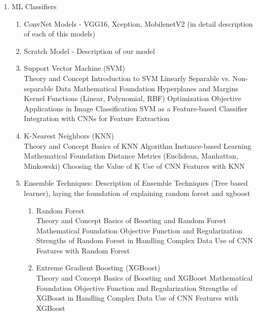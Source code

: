 \begin{enumerate}
\begin{enumerate}
           \item ML Classifiers
                \begin{enumerate}
                    \item ConvNet Models - VGG16, Xception, MobilenetV2 (in detail description of each of this models)
                    \item Scratch Model - Description of our model
                    \item Support Vector Machine (SVM)\\
                        Theory and Concept
                        Introduction to SVM
                        Linearly Separable vs. Non-separable Data
                        Mathematical Foundation
                        Hyperplanes and Margins
                        Kernel Functions (Linear, Polynomial, RBF)
                        Optimization Objective
                        Applications in Image Classification
                        SVM as a Feature-based Classifier
                        Integration with CNNs for Feature Extraction
                        
                    \item K-Nearest Neighbors (KNN)\\
                        Theory and Concept
                        Basics of KNN Algorithm
                        Instance-based Learning
                        Mathematical Foundation
                        Distance Metrics (Euclidean, Manhattan, Minkowski)
                        Choosing the Value of K
                        Use of CNN Features with KNN\\
                    \item Ensemble Techniques: Description of Ensemble Techniques (Tree based learner), laying the foundation of explaining random forest and xgboost
                    \begin{enumerate}
                        \item Random Forest\\                
                        Theory and Concept
                        Basics of Boosting and Random Forest
                        Mathematical Foundation
                        Objective Function and Regularization
                        Strengths of Random Forest in Handling Complex Data
                        Use of CNN Features with Random Forest
                        
                      \item Extreme Gradient Boosting (XGBoost)\\                
                        Theory and Concept
                        Basics of Boosting and XGBoost
                        Mathematical Foundation
                        Objective Function and Regularization
                        Strengths of XGBoost in Handling Complex Data
                        Use of CNN Features with XGBoost\\\\
                    \end{enumerate}
                    

\end{enumerate}
\end{enumerate}
\end{enumerate}
